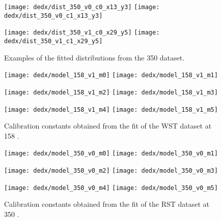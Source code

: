 \clearpage

\begin{figure}
  \centering
  \texttt{[image: dedx/dist\_350\_v0\_c0\_x13\_y3]}
  \texttt{[image: dedx/dist\_350\_v0\_c1\_x13\_y3]}

  \vspace{0.5cm}
  
  \texttt{[image: dedx/dist\_350\_v1\_c0\_x29\_y5]}
  \texttt{[image: dedx/dist\_350\_v1\_c1\_x29\_y5]}
  
  \caption{Examples of the fitted \dedx distributions from the 350 \GeVc dataset.}
  \label{fig:hadron:dedx:fit:dist350}
\end{figure}

\begin{figure}
  \centering
  \texttt{[image: dedx/model\_158\_v1\_m0]}
  \texttt{[image: dedx/model\_158\_v1\_m1]}

  \texttt{[image: dedx/model\_158\_v1\_m2]}
  \texttt{[image: dedx/model\_158\_v1\_m3]}

  \texttt{[image: dedx/model\_158\_v1\_m4]}
  \texttt{[image: dedx/model\_158\_v1\_m5]}
  \caption{Calibration constants obtained from the fit of the WST dataset at 158 \GeVc.}
  \label{fig:hadron:dedx:fit:cal158w}
\end{figure}

\begin{figure}
  \centering
  \texttt{[image: dedx/model\_350\_v0\_m0]}
  \texttt{[image: dedx/model\_350\_v0\_m1]}

  \texttt{[image: dedx/model\_350\_v0\_m2]}
  \texttt{[image: dedx/model\_350\_v0\_m3]}

  \texttt{[image: dedx/model\_350\_v0\_m4]}
  \texttt{[image: dedx/model\_350\_v0\_m5]}
  \caption{Calibration constants obtained from the fit of the RST dataset at 350 \GeVc.}
  \label{fig:hadron:dedx:fit:cal350r}
\end{figure}


